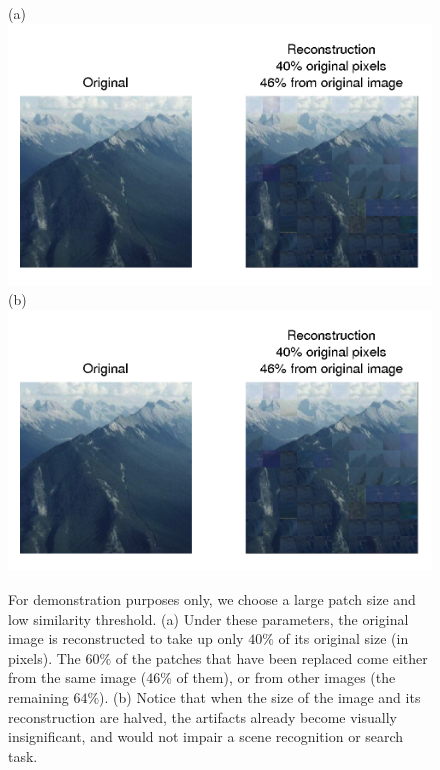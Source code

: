  \begin{figure}
\centering
(a) \includegraphics[width=0.9\linewidth]{Figures/184.png}
(b) \includegraphics[width=0.4\linewidth]{Figures/184.png}
\caption{For demonstration purposes only, we choose a large patch size and low similarity threshold. (a) Under these parameters, the original image is reconstructed to take up only $40\%$ of its original size (in pixels). The $60\%$ of the patches that have been replaced come either from the same image ($46\%$ of them), or from other images (the remaining $64\%$). (b) Notice that when the size of the image and its reconstruction are halved, the artifacts already become visually insignificant, and would not impair a scene recognition or search task. }
\label{fig:badrecon}
\end{figure}

